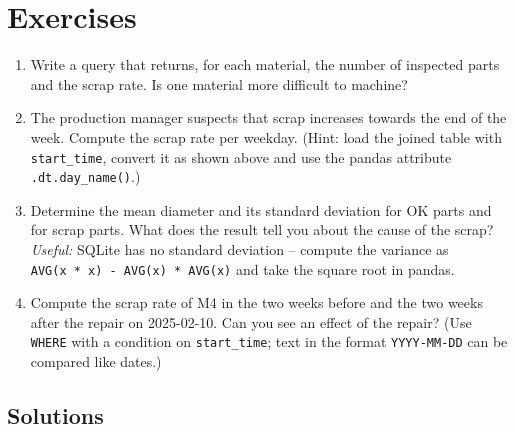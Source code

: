 \documentclass[
  letterpaper,
  DIV=11,
  numbers=noendperiod]{scrreprt}
\providecommand{\tightlist}{%
  \setlength{\itemsep}{0pt}\setlength{\parskip}{0pt}}\usepackage{longtable,booktabs,array}
\begin{document}
\section{Exercises}\label{exercises-13}

\begin{enumerate}
\def\labelenumi{\arabic{enumi}.}
\tightlist
\item
  Write a query that returns, for each material, the number of inspected
  parts and the scrap rate. Is one material more difficult to machine?
\item
  The production manager suspects that scrap increases towards the end
  of the week. Compute the scrap rate per weekday. (Hint: load the
  joined table with \texttt{start\_time}, convert it as shown above and
  use the pandas attribute \texttt{.dt.day\_name()}.)
\item
  Determine the mean diameter and its standard deviation for OK parts
  and for scrap parts. What does the result tell you about the cause of
  the scrap? \emph{Useful:} SQLite has no standard deviation -- compute
  the variance as \texttt{AVG(x\ *\ x)\ -\ AVG(x)\ *\ AVG(x)} and take
  the square root in pandas.
\item
  Compute the scrap rate of M4 in the two weeks before and the two weeks
  after the repair on 2025-02-10. Can you see an effect of the repair?
  (Use \texttt{WHERE} with a condition on \texttt{start\_time}; text in
  the format \texttt{YYYY-MM-DD} can be compared like dates.)
\end{enumerate}

\subsection{Solutions}\label{solutions-14}
\end{document}
